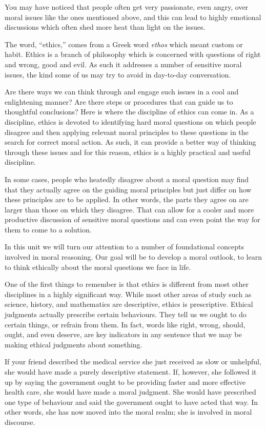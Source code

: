 \documentclass[
]{book}
\begin{document}
You may have noticed that people often get very passionate, even angry, over moral issues like the ones mentioned above, and this can lead to highly emotional discussions which often shed more heat than light on the issues.

The word, ``ethics,'' comes from a Greek word \emph{ethos} which meant custom or habit. Ethics is a branch of philosophy which is concerned with questions of right and wrong, good and evil. As such it addresses a number of sensitive moral issues, the kind some of us may try to avoid in day-to-day conversation.

Are there ways we can think through and engage such issues in a cool and enlightening manner? Are there steps or procedures that can guide us to thoughtful conclusions? Here is where the discipline of ethics can come in. As a discipline, ethics is devoted to identifying hard moral questions on which people disagree and then applying relevant moral principles to these questions in the search for correct moral action. As such, it can provide a better way of thinking through these issues and for this reason, ethics is a highly practical and useful discipline.

In some cases, people who heatedly disagree about a moral question may find that they actually agree on the guiding moral principles but just differ on how these principles are to be applied. In other words, the parts they agree on are larger than those on which they disagree. That can allow for a cooler and more productive discussion of sensitive moral questions and can even point the way for them to come to a solution.

In this unit we will turn our attention to a number of foundational concepts involved in moral reasoning. Our goal will be to develop a moral outlook, to learn to think ethically about the moral questions we face in life.

One of the first things to remember is that ethics is different from most other disciplines in a highly significant way. While most other areas of study such as science, history, and mathematics are descriptive, ethics is prescriptive. Ethical judgments actually prescribe certain behaviours. They tell us we ought to do certain things, or refrain from them. In fact, words like right, wrong, should, ought, and even deserve, are key indicators in any sentence that we may be making ethical judgments about something.

If your friend described the medical service she just received as slow or unhelpful, she would have made a purely descriptive statement. If, however, she followed it up by saying the government ought to be providing faster and more effective health care, she would have made a moral judgment. She would have prescribed one type of behaviour and said the government ought to have acted that way. In other words, she has now moved into the moral realm; she is involved in moral discourse.
\end{document}
